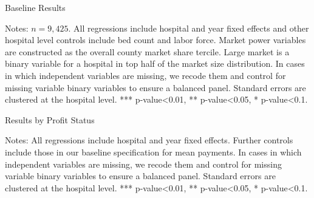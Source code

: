 \documentclass[12pt]{article}
\begin{document}
\setlength{\captionmargin}{.5 \textwidth} \addtolength{\captionmargin}{-.5\wd\gfxbox}
\begin{table}[!h]
\centering
\caption{Baseline Results}
\label{tab:baselineresults}
\usebox{\gfxbox}
\par
\begin{minipage}{\wd\gfxbox}
\footnotesize
Notes: $n=9,425$.  All regressions include hospital and year fixed effects and other hospital level controls include bed count and labor force.  Market power variables are constructed as the overall county market share tercile.  Large market is a binary variable for a hospital in top half of the market size distribution.  In cases in which independent variables are missing, we recode them and control for missing variable binary variables to ensure a balanced panel.  Standard errors are clustered at the hospital level.  *** p-value<0.01, ** p-value<0.05, * p-value<0.1.
\end{minipage}
\end{table}

\newpage
{}
\setlength{\captionmargin}{.5 \textwidth} \addtolength{\captionmargin}{-.5\wd\gfxbox}
\begin{table}[!h]
\centering
\caption{Results by Profit Status}
\label{tab:byprofit}
\usebox{\gfxbox}
\par
\begin{minipage}{\wd\gfxbox}
\footnotesize
Notes: All regressions include hospital and year fixed effects.  Further controls include those in our baseline specification for mean payments.  In cases in which independent variables are missing, we recode them and control for missing variable binary variables to ensure a balanced panel.  Standard errors are clustered at the hospital level.  *** p-value<0.01, ** p-value<0.05, * p-value<0.1.
\end{minipage}
\end{table}
\end{document}
